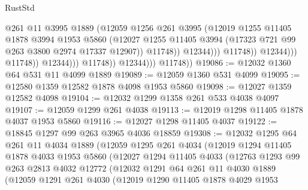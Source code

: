 \begin{lexlean}{RustStd}
\begin{coremodule}
{\begin{coremodule}
{{{{{{{{{{{{{{{{{{{{{{{{{{{{{                                            @261
                                            @11
                                            @3995
                                            @1889
                                            (@12059
                                              @1256
                                              @261
                                              @3995
                                              (@12019
                                                @1255
                                                @11405
                                                @1878
                                                @3994
                                                @1953
                                                @5860
                                                (@12027
                                                  @1255
                                                  @11405
                                                  @3994
                                                  (@17323 @721 @99 @263 @3800 @2974 @17337 @12907))
                                                @11748))
                                            @12344)))
                                      @11748))
                                  @12344)))
                            @11748))
                        @12344)))
                  @11748))
              @12344)))
        @11748))
@19086 := @12032 @1360 @64 @531 @11 @4099 @1889
@19089 := @12059 @1360 @531 @4099
@19095 := @12580 @1359 @12582 @1878 @4098 @1953 @5860
@19098 := @12027 @1359 @12582 @4098
@19104 := @12032 @1299 @1358 @261 @533 @4038 @4097
@19107 := @12059 @1299 @261 @4038
@19113 := @12019 @1298 @11405 @1878 @4037 @1953 @5860
@19116 := @12027 @1298 @11405 @4037
@19122 := @18845 @1297 @99 @263 @3965 @4036 @18859
@19308 := @12032
    @1295
    @64
    @261
    @11
    @4034
    @1889
    (@12059
      @1295
      @261
      @4034
      (@12019
        @1294
        @11405
        @1878
        @4033
        @1953
        @5860
        (@12027
          @1294
          @11405
          @4033
          (@12763
            @1293
            @99
            @263
            @2813
            @4032
            @12772
            (@12032
              @1291
              @64
              @261
              @11
              @4030
              @1889
              (@12059
                @1291
                @261
                @4030
                (@12019
                  @1290
                  @11405
                  @1878
                  @4029
                  @1953
}}}}}}}}}}}}}}}}}}}}}}}}}}}}}
\end{coremodule}}
\end{coremodule}
\end{lexlean}
